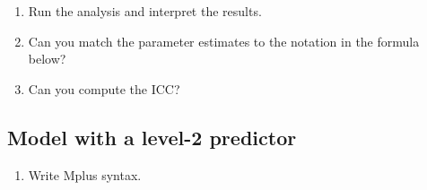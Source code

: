 \documentclass[
]{book}
\providecommand{\tightlist}{%
  \setlength{\itemsep}{0pt}\setlength{\parskip}{0pt}}
\begin{document}
\begin{enumerate}
\def\labelenumi{\arabic{enumi}.}
\setcounter{enumi}{1}
\item
  Run the analysis and interpret the results.
\item
  Can you match the parameter estimates to the notation in the formula below?
\item
  Can you compute the ICC?
\end{enumerate}

\hypertarget{model-with-a-level-2-predictor}{%
\subsection{Model with a level-2 predictor}\label{model-with-a-level-2-predictor}}

\begin{enumerate}
\def\labelenumi{\arabic{enumi}.}
\tightlist
\item
  Write Mplus syntax.
\end{enumerate}
\end{document}

